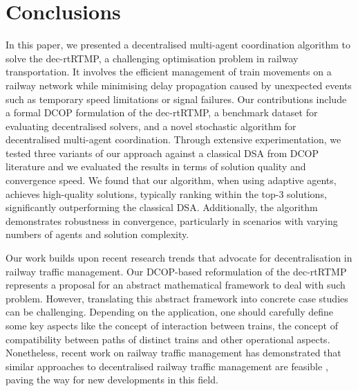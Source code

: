 \section{Conclusions}
\label{sec:conclusions}

In this paper, we presented a decentralised multi-agent coordination algorithm to solve the dec-rtRTMP, a challenging optimisation problem in railway transportation. It involves the efficient management of train movements on a railway network while minimising delay propagation caused by unexpected events such as temporary speed limitations or signal failures. 
%
Our contributions include a formal DCOP formulation of the dec-rtRTMP, a benchmark dataset for evaluating decentralised solvers, and a novel stochastic algorithm for decentralised multi-agent coordination. Through extensive experimentation, we tested three variants of our approach against a classical DSA from DCOP literature and we evaluated the results in terms of solution quality and convergence speed. We found that our algorithm, when using adaptive agents, achieves high-quality solutions, typically ranking within the top-3 solutions, significantly outperforming the classical DSA. Additionally, the algorithm demonstrates robustness in convergence, particularly in scenarios with varying numbers of agents and solution complexity.

Our work builds upon recent research trends that advocate for decentralisation in railway traffic management. Our DCOP-based reformulation of the dec-rtRTMP represents a proposal for an abstract mathematical framework to deal with such problem. However, translating this abstract framework into concrete case studies can be challenging. Depending on the application, one should carefully define some key aspects like the concept of interaction between trains, the concept of compatibility between paths of distinct trains and other operational aspects. Nonetheless, recent work on railway traffic management has demonstrated that similar approaches to decentralised railway traffic management are feasible \cite{mohanty2020flatlandrl,DAMATO2024100427}, paving the way for new developments in this field.

